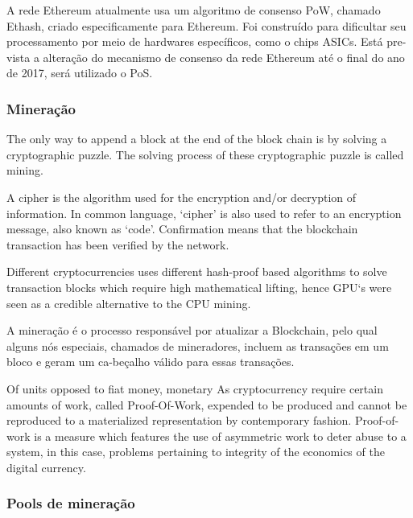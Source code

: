 \documentclass[
	article,			%
	12pt,				%
	openright,			%
	oneside,			%
	a4paper,			%
	chapter=TITLE,		%
	section=TITLE,		%
	subsection=TITLE,	%
	subsubsection=TITLE,%
	subsubsubsection=TITLE, %
	english,			%
	brazil,				%
	]{abntex2}
\begin{document}
\cite{Dlamini2017}

A rede Ethereum atualmente usa um algoritmo de consenso PoW, chamado Ethash, criado especificamente para Ethereum. Foi construído para dificultar seu processamento por meio de hardwares específicos, como o chips ASICs. Está pre-vista a alteração do mecanismo de consenso da rede Ethereum até o final do ano de 2017, será utilizado o PoS.

\cite{Dlamini2017}

\subsubsection{Mineração}

The only way to append a block at the end of the block chain is by solving a cryptographic puzzle. The solving process of these cryptographic puzzle is called
mining.

\cite{Weber2012}

A cipher is the algorithm used for the encryption and/or decryption of information. In common language, ‘cipher’ is also used to refer to an encryption message, also known as ‘code’. Confirmation means that the blockchain transaction has been verified by the network.

\cite{Arsov}

Different cryptocurrencies uses different hash-proof based algorithms to solve transaction blocks which require high mathematical lifting, hence GPU‘s were seen as a credible alternative to the CPU mining.

\cite{Krishnan2015}

A mineração é o processo responsável por atualizar a Blockchain, pelo qual alguns nós especiais, chamados de mineradores, incluem as transações em um bloco e geram um ca-beçalho válido para essas transações.

\cite{LChicarino}


Of units opposed to fiat money, monetary As cryptocurrency require
certain amounts of work, called Proof-Of-Work, expended to be produced
and cannot be reproduced to a materialized representation by
contemporary fashion. Proof-of-work is a measure which features the
use of asymmetric work to deter abuse to a system, in this case,
problems pertaining to integrity of the economics of the digital
currency.

\cite{Dev2014}

\subsubsection{Pools de mineração}
\end{document}
